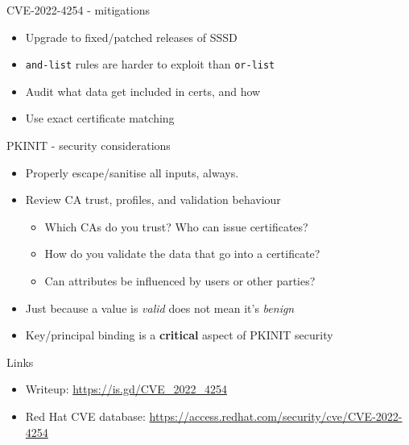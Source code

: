 \documentclass[ignorenonframetext,aspectratio=169,12pt]{beamer}
\begin{document}
\begin{frame}{CVE-2022-4254 - mitigations}
\protect\hypertarget{vuln-mitigations}{}

\begin{itemize}
\item Upgrade to fixed/patched releases of SSSD
\item {\tt and-list} rules are harder to exploit than {\tt or-list}
\item Audit what data get included in certs, and how
\item Use exact certificate matching
\end{itemize}
\end{frame}

\begin{frame}{PKINIT - security considerations}
\protect\hypertarget{pkinit-security-considerations}{}

\begin{itemize}
\item Properly escape/sanitise all inputs, always.
\item Review CA trust, profiles, and validation behaviour
    \begin{itemize}
    \item Which CAs do you trust?  Who can issue certificates?
    \item How do you validate the data that go into a certificate?
    \item Can attributes be influenced by users or other parties?
    \end{itemize}
\item Just because a value is {\em valid} does not mean it's {\em benign}
\item Key/principal binding is a {\bf critical} aspect of PKINIT security
\end{itemize}
\end{frame}


\begin{frame}{Links}
\protect\hypertarget{links}{}

\begin{itemize}
\item Writeup: \url{https://is.gd/CVE_2022_4254}
\item Red Hat CVE database: \url{https://access.redhat.com/security/cve/CVE-2022-4254}
\end{itemize}

\end{frame}
\end{document}
